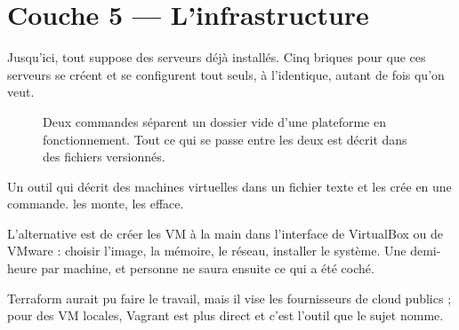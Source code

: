 \chapter{Couche 5 — L'infrastructure}

Jusqu'ici, tout suppose des serveurs déjà installés. Cinq briques pour que ces
serveurs se créent et se configurent tout seuls, à l'identique, autant de fois
qu'on veut.

\begin{figure}[htbp]
\centering
{}
\caption{Deux commandes séparent un dossier vide d'une plateforme en
fonctionnement. Tout ce qui se passe entre les deux est décrit dans des fichiers
versionnés.}
\end{figure}


\quoi
Un outil qui décrit des machines virtuelles dans un fichier texte et les crée en
une commande.  les monte,  les efface.

\pourquoi
L'alternative est de créer les VM à la main dans l'interface de VirtualBox ou de
VMware : choisir l'image, la mémoire, le réseau, installer le système. Une demi-
heure par machine, et personne ne saura ensuite ce qui a été coché.

Terraform aurait pu faire le travail, mais il vise les fournisseurs de cloud
publics ; pour des VM locales, Vagrant est plus direct et c'est l'outil que le
sujet nomme.

